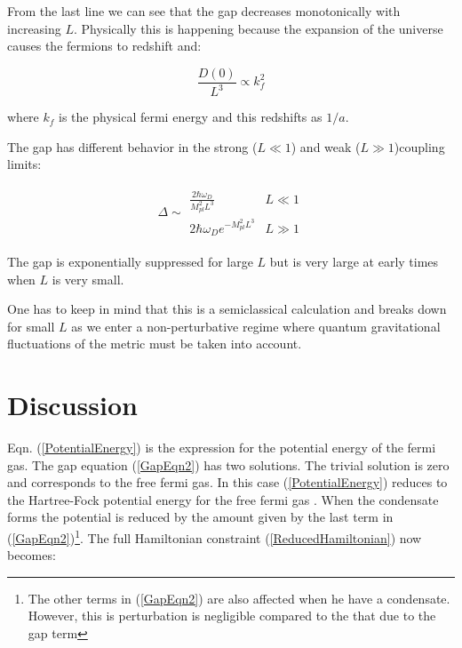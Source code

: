 \begin{doublespace}
From the last line we can see that the gap decreases monotonically with increasing $L$. Physically
this is happening because the expansion of the universe causes the fermions to redshift and:

\begin{equation}
    \frac{D(0)}{L^3} \propto k^2_f
\end{equation}

where $k_f$ is the physical fermi energy and this redshifts as $1/a$.


The gap has different behavior in the strong ($L \ll 1$) and weak ($L \gg 1$)coupling limits:

\begin{eqnarray}
    \Delta \sim \begin{array}{cc} \frac{2 \hbar
    \omega_D}{M^2_{pl}L^3}& L \ll 1\\2 \hbar
    \omega_D e^{-M^2_{pl}L^3}& L \gg 1\end{array}
\end{eqnarray}

The gap is exponentially suppressed for large $L$ but is very large at early times when $L$ is very
small.

One has to keep in mind that this is a semiclassical calculation and breaks down for small $L$ as
we enter a non-perturbative regime where quantum gravitational fluctuations of the metric must be
taken into account.

\section{Discussion}

Eqn. (\ref{PotentialEnergy}) is the expression for the potential energy of the fermi gas. The gap
equation (\ref{GapEqn2}) has two solutions. The trivial solution is zero and corresponds to the
free fermi gas. In this case (\ref{PotentialEnergy}) reduces to the Hartree-Fock potential energy
for the free fermi gas \cite{Fetter2003Quantum}. When the condensate forms the potential is reduced by
the amount given by the last term in (\ref{GapEqn2})\footnote{The other terms in (\ref{GapEqn2})
are also affected when he have a condensate. However, this is perturbation is negligible compared
to the that due to the gap term}. The full Hamiltonian constraint (\ref{ReducedHamiltonian}) now
becomes:


\end{doublespace}

